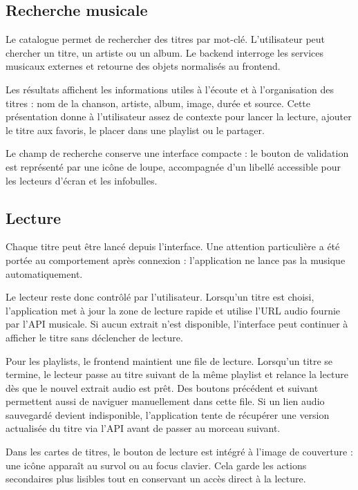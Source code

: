 \documentclass[12pt,a4paper]{report}
\begin{document}
\subsection{Recherche musicale}

Le catalogue permet de rechercher des titres par mot-clé. L'utilisateur peut
chercher un titre, un artiste ou un album. Le backend interroge les services
musicaux externes et retourne des objets normalisés au frontend.

Les résultats affichent les informations utiles à l'écoute et à l'organisation
des titres : nom de la chanson, artiste, album, image, durée et source. Cette
présentation donne à l'utilisateur assez de contexte pour lancer la lecture,
ajouter le titre aux favoris, le placer dans une playlist ou le partager.

Le champ de recherche conserve une interface compacte : le bouton de validation
est représenté par une icône de loupe, accompagnée d'un libellé accessible pour
les lecteurs d'écran et les infobulles.

\subsection{Lecture}

Chaque titre peut être lancé depuis l'interface. Une attention particulière a
été portée au comportement après connexion : l'application ne lance pas la
musique automatiquement.

Le lecteur reste donc contrôlé par l'utilisateur. Lorsqu'un titre est choisi,
l'application met à jour la zone de lecture rapide et utilise l'URL audio
fournie par l'API musicale. Si aucun extrait n'est disponible, l'interface peut
continuer à afficher le titre sans déclencher de lecture.

Pour les playlists, le frontend maintient une file de lecture. Lorsqu'un titre
se termine, le lecteur passe au titre suivant de la même playlist et relance la
lecture dès que le nouvel extrait audio est prêt. Des boutons précédent et
suivant permettent aussi de naviguer manuellement dans cette file. Si un lien
audio sauvegardé devient indisponible, l'application tente de récupérer une
version actualisée du titre via l'API avant de passer au morceau suivant.

Dans les cartes de titres, le bouton de lecture est intégré à l'image de
couverture : une icône apparaît au survol ou au focus clavier. Cela garde les
actions secondaires plus lisibles tout en conservant un accès direct à la
lecture.
\end{document}
